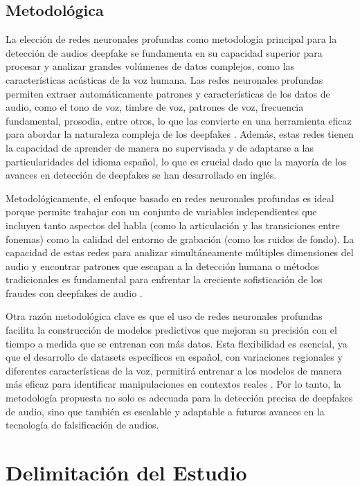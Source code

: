 \subsection{Metodológica}

La elección de redes neuronales profundas como metodología principal para la detección de audios deepfake se fundamenta en su capacidad superior para procesar y analizar grandes volúmenes de datos complejos, como las características acústicas de la voz humana. Las redes neuronales profundas permiten extraer automáticamente patrones y características de los datos de audio, como el tono de voz, timbre de voz, patrones de voz, frecuencia fundamental, prosodia, entre otros, lo que las convierte en una herramienta eficaz para abordar la naturaleza compleja de los deepfakes \parencite{heidari2023}. Además, estas redes tienen la capacidad de aprender de manera no supervisada y de adaptarse a las particularidades del idioma español, lo que es crucial dado que la mayoría de los avances en detección de deepfakes se han desarrollado en inglés.

Metodológicamente, el enfoque basado en redes neuronales profundas es ideal porque permite trabajar con un conjunto de variables independientes que incluyen tanto aspectos del habla (como la articulación y las transiciones entre fonemas) como la calidad del entorno de grabación (como los ruidos de fondo). La capacidad de estas redes para analizar simultáneamente múltiples dimensiones del audio y encontrar patrones que escapan a la detección humana o métodos tradicionales es fundamental para enfrentar la creciente sofisticación de los fraudes con deepfakes de audio \parencite{ji2024}.

Otra razón metodológica clave es que el uso de redes neuronales profundas facilita la construcción de modelos predictivos que mejoran su precisión con el tiempo a medida que se entrenan con más datos. Esta flexibilidad es esencial, ya que el desarrollo de datasets específicos en español, con variaciones regionales y diferentes características de la voz, permitirá entrenar a los modelos de manera más eficaz para identificar manipulaciones en contextos reales \parencite{rojas2023}. Por lo tanto, la metodología propuesta no solo es adecuada para la detección precisa de deepfakes de audio, sino que también es escalable y adaptable a futuros avances en la tecnología de falsificación de audios. 

\section{Delimitación del Estudio}

